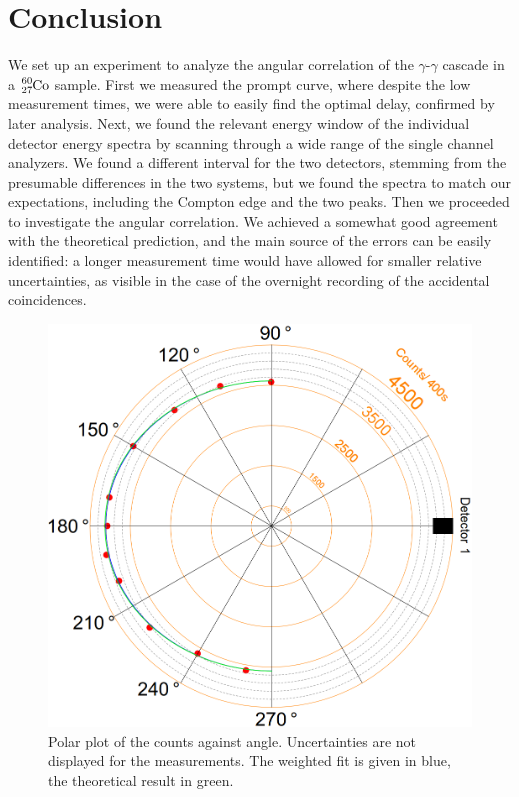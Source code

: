 \documentclass[twocolumn]{article}
\begin{document}
\section{Conclusion}
We set up an experiment to analyze the angular correlation of the $\gamma$-$\gamma$ cascade in a $\ce{_27^{60}Co}$ sample. First we measured the prompt curve, where despite the low measurement times, we were able to easily find the optimal delay, confirmed by later analysis. Next, we found the relevant energy window of the individual detector energy spectra by scanning through a wide range of the single channel analyzers. We found a different interval for the two detectors, stemming from the presumable differences in the two systems, but we found the spectra to match our expectations, including the Compton edge and the two peaks. Then we proceeded to investigate the angular correlation. We achieved a somewhat good agreement with the theoretical prediction, and the main source of the errors can be easily identified: a longer measurement time would have allowed for smaller relative uncertainties, as visible in the case of the overnight recording of the accidental coincidences.
\begin{figure}[t!]
	\centering
	\includegraphics[width=\linewidth]{polar2.png}
	\caption{Polar plot of the counts against angle. Uncertainties are not displayed for the measurements. The weighted fit is given in blue, the theoretical result in green.}
	\label{fig:polar}
\end{figure}
\end{document}
